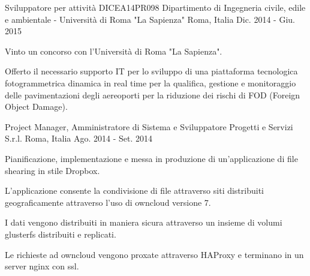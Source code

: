 \begin{cventries}
  \cventry
    {Sviluppatore per attività DICEA14PR098} %
    {Dipartimento di Ingegneria civile, edile e ambientale - Università di Roma "La Sapienza"} %
    {Roma, Italia} %
    {Dic. 2014 - Giu. 2015} %
    {
      \begin{cvitems} %
        \item {Vinto un concorso con l'Università di Roma "La Sapienza".}
        \item {Offerto il necessario supporto IT per lo sviluppo di una piattaforma tecnologica fotogrammetrica dinamica in real time per la qualifica, gestione e monitoraggio delle pavimentazioni degli aereoporti per la riduzione dei rischi di FOD (Foreign Object Damage).}
      \end{cvitems}
    }

  \cventry
    {Project Manager, Amministratore di Sistema e Sviluppatore} %
    {Progetti e Servizi S.r.l.} %
    {Roma, Italia} %
    {Ago. 2014 - Set. 2014} %
    {
      \begin{cvitems} %
        \item {Pianificazione, implementazione e messa in produzione di un'applicazione di file shearing in stile Dropbox.}
        \item {L'applicazione consente la condivisione di file attraverso siti distribuiti geograficamente attraverso l'uso di owncloud versione 7.}
        \item {I dati vengono distribuiti in maniera sicura attraverso un insieme di volumi glusterfs distribuiti e replicati.}
        \item {Le richieste ad owncloud vengono proxate attraverso HAProxy e terminano in un server nginx con ssl.}
      \end{cvitems}
    }


\end{cventries}
